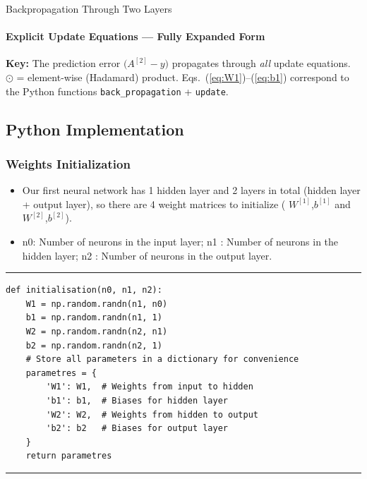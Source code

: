 \documentclass[aspectratio=169]{beamer}
\begin{document}
%
%
\begin{frame}{Backpropagation Through Two Layers}
\framesubtitle{Explicit Update Equations --- Fully Expanded Form}

\colorbox{blue!8}{\parbox{0.96\linewidth}{\scriptsize
\textbf{Key:} The prediction error $\bigl(A^{[2]}\!-y\bigr)$ propagates through \emph{all} update equations. \;\; $\odot$ = element-wise (Hadamard) product. \;\; Eqs.~(\ref{eq:W1})--(\ref{eq:b1}) correspond to the Python functions \texttt{back\_propagation} + \texttt{update}.}}

\end{frame}
%
\subsection{Python Implementation}
%
\begin{frame}[fragile]
\frametitle{Weights Initialization}
\begin{itemize}
\item Our first neural network has 1 hidden layer and 2 layers in total (hidden layer + output layer), so there are 4 weight matrices to initialize ( $W^{[1]}$,$b^{[1]}$  and  $W^{[2]}$,$b^{[2]}$). 
\item n0: Number of neurons in the input layer; n1 : Number of neurons in the hidden layer; n2 : Number of neurons in the output layer.
\end{itemize}
\rule{\textwidth}{1pt}
\scriptsize
\begin{verbatim}
def initialisation(n0, n1, n2):
    W1 = np.random.randn(n1, n0) 
    b1 = np.random.randn(n1, 1)
    W2 = np.random.randn(n2, n1) 
    b2 = np.random.randn(n2, 1)
    # Store all parameters in a dictionary for convenience
    parametres = {
        'W1': W1,  # Weights from input to hidden
        'b1': b1,  # Biases for hidden layer
        'W2': W2,  # Weights from hidden to output
        'b2': b2   # Biases for output layer
    }
    return parametres
\end{verbatim}
\rule{\textwidth}{1pt}
\end{frame}
%
%
\end{document}
